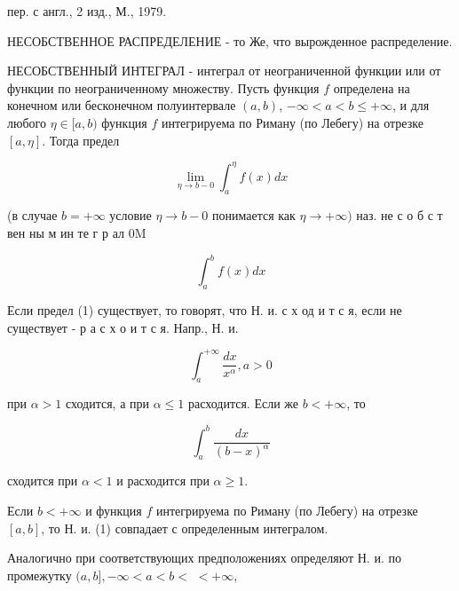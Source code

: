 \documentclass[10pt]{article}
\begin{document}
пер. с англ., 2 изд., М., 1979.



НЕСОБСТВЕННОЕ РАСПРЕДЕЛЕНИЕ - то Же, что вырожденное распределение.



НЕСОБСТВЕННЫЙ ИНТЕГРАЛ - интеграл от неограниченной функции или от функции по неограниченному множеству. Пусть функция $f$ определена на конечном или бесконечном полуинтервале $(a, b)$, $-\infty<a<b \leqslant+\infty$, и для любого $\eta \in[a, b)$ функция $f$ интегрируема по Риману (по Лебегу) на отрезке $[a, \eta]$. Тогда предел



\[

\lim _{\eta \rightarrow b-0} \int_{a}^{\eta} f(x) d x

\]



(в случае $b=+\infty$ условие $\eta \rightarrow b-0$ понимается как $\eta \rightarrow+\infty)$ наз. не с о б с т вен ны м ин те г р ал $0 \mathrm{M}$



\[

\int_{a}^{b} f(x) d x

\]



Если предел (1) существует, то говорят, что Н. и. с х од и т с я, если не существует - р а с х о и т с я. Напр., Н. и.



\[

\int_{a}^{+\infty} \frac{d x}{x^{\alpha}}, a>0

\]



при $\alpha>1$ сходится, а при $\alpha \leqslant 1$ расходится. Если же $b<+\infty$, то



\[

\int_{a}^{b} \frac{d x}{(b-x)^{\alpha}}

\]



сходится при $\alpha<1$ и расходится при $\alpha \geqslant 1$.



Если $b<+\infty$ и функция $f$ интегрируема по Риману (по Лебегу) на отрезке $[a, b]$, то Н. и. (1) совпадает с определенным интегралом.



Аналогично при соответствующих предположениях определяют Н. и. по промежутку $(a, b],-\infty<a<b<$ $<+\infty$,
\end{document}
